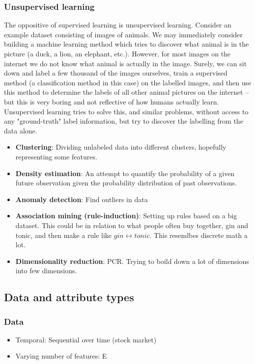 \documentclass{article}
\begin{document}
\subsubsection{Unsupervised learning}
The oppositive of supervised learning is unsupervised learning. Consider an example dataset consisting of images of animals. We may immediately consider building a machine learning method which tries to discover what animal is in the picture (a duck, a lion, an elephant, etc.). However, for most images on the internet we do not know what animal is actually in the image. Surely, we can sit down and label a few thousand of the images ourselves, train a supervised method (a classiﬁcation method in this case) on the labelled images, and then use this method to determine the labels of all other animal pictures on the internet – but this is very boring and not reﬂective of how humans actually learn. Unsupervised learning tries to solve this, and similar problems, without access to any "ground-truth" label information, but try to discover the labelling from the data alone.

\begin{itemize}
    \item \textbf{Clustering}: Dividing unlabeled data into different clusters, hopefully representing some features.
    \item \textbf{Density estimation}: An attempt to quantify the probability of a given future observation given the probability distribution of past observations.
    \item \textbf{Anomaly detection}: Find outliers in data
    \item \textbf{Association mining (rule-induction)}: Setting up rules based on a big dataset. This could be in relation to what people often buy together, gin and tonic, and then make a rule like $gin \leftrightarrow tonic$. This resemlbes discrete math a lot. 
    \item \textbf{Dimensionality reduction}: PCR. Trying to boild down a lot of dimensions into few dimensions.
\end{itemize}

\subsection{Data and attribute types}
\subsubsection{Data}
\begin{itemize}
    \item Temporal: Sequential over time (stock market)
    \item Varying number of features: E
\end{itemize}
\end{document}
